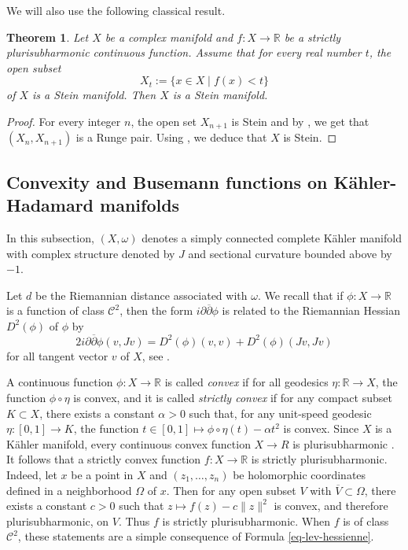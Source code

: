 \documentclass{article}
\newtheorem*{theorem*}{Theorem}
\theoremstyle{definition}
\theoremstyle{remark}
\newcommand{\R}{\mathbb{R}}
\begin{document}
	We will also use the following classical result.
	
	\begin{theorem*}\label{thm-docquier-grauert}
		Let $X$ be a complex manifold and $f:X\to \R$ be a strictly plurisubharmonic continuous function. Assume that for every real number $t$, the open subset \begin{equation*}
			X_t := \{x\in X\mid f(x)<t\}
		\end{equation*}
		of $X$ is a Stein manifold. Then $X$ is a Stein manifold.
	\end{theorem*}
	
	\begin{proof}
		For every integer $n$, the open set $X_{n+1}$ is Stein and by \cite[Corollary 1]{narasimhanLeviProblemComplex1962}, we get that $(X_{n},X_{n+1})$ is a Runge pair. Using \cite[Satz 1.3]{steinUberlagerungenHolomorphvollstandigerKomplexer1956}, we deduce that $X$ is Stein.
	\end{proof}
	
	
	\subsection{Convexity and Busemann functions on Kähler-Hadamard manifolds}

	In this subsection, $(X,\omega)$ denotes a simply connected complete Kähler manifold with complex structure denoted by $J$ and sectional curvature bounded above by $-1$.
	
	Let $d$ be the Riemannian distance associated with $\omega$. We recall that if $\phi:X\to \R$ is a function of class $\mathcal{C}^2$, then the form $i\partial\overline{\partial}\phi$ is related to the Riemannian Hessian $D^{2}(\phi)$ of $\phi$ by  \begin{equation}\label{eq-lev-hessienne}
		2i\partial\overline{\partial}\phi(v,Jv)=D^{2}(\phi)(v,v)+D^{2}(\phi)(Jv,Jv)
	\end{equation}
	for all tangent vector $v$ of $X$, see \cite{greeneSubharmonicityPlurisubharmonicityGeodesically1973}.
	
	 A continuous function $\phi:X\longrightarrow \R$ is called \textit{convex} if for all geodesics $\eta:\R\to X$, the function $\phi\circ\eta$ is convex, and it is called \textit{strictly convex} if for any compact subset $K\subset X$, there exists a constant $\alpha>0$ such that, for any unit-speed geodesic $\eta:[0,1]\to K$, the function $t\in [0,1]\mapsto \phi\circ\eta(t)-\alpha t^{2}$ is convex. Since $X$ is a Kähler manifold, every continuous convex function $X\to R$ is plurisubharmonic \cite[Theorem 3]{greeneSubharmonicityPlurisubharmonicityGeodesically1973}. It follows that a strictly convex function $f:X\to \R$ is strictly plurisubharmonic. Indeed, let $x$ be a point in $X$ and $(z_1,\dots,z_n)$ be holomorphic coordinates defined in a neighborhood $\Omega$ of $x$. Then for any open subset $V$ with $\overline{V}\subset \Omega$, there exists a constant $c>0$ such that $z\mapsto f(z)-c\lVert z\rVert^{2}$ is convex, and therefore plurisubharmonic, on $V$. Thus $f$ is strictly plurisubharmonic. When $f$ is of class $\mathcal{C}^2$, these statements are a simple consequence of Formula \eqref{eq-lev-hessienne}.
	
\end{document}
